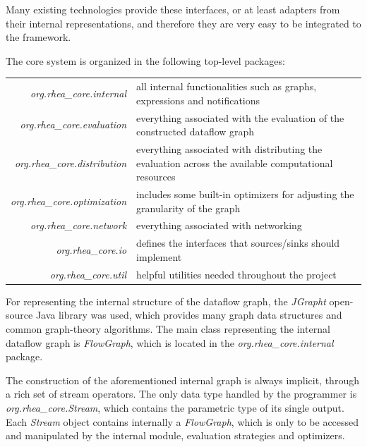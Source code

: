 \documentclass{dithesis}
\begin{document}
Many existing technologies provide these interfaces, or at least adapters from their internal representations, and therefore they are very easy to be integrated to the framework.

The core system is organized in the following top-level packages:

\begin{tabularx}{\textwidth}{rX}
	\textit{org.rhea\_core.internal} 
	& all internal functionalities such as graphs, expressions and notifications \\
	\textit{org.rhea\_core.evaluation}
	& everything associated with the evaluation of the constructed dataflow graph \\
	\textit{org.rhea\_core.distribution}
	& everything associated with distributing the evaluation across the available computational resources \\
	\textit{org.rhea\_core.optimization}	
	& includes some built-in optimizers for adjusting the  granularity of the graph \\
	\textit{org.rhea\_core.network}	
	& everything associated with networking \\
	\textit{org.rhea\_core.io}
	& defines the interfaces that sources/sinks should implement \\
	\textit{org.rhea\_core.util}
	& helpful utilities needed throughout the project \\
\end{tabularx}


For representing the internal structure of the dataflow graph, the \textit{JGrapht} open-source Java library was used, which provides many graph data structures and common graph-theory algorithms\cite{jgraph}. The main class representing the internal dataflow graph is \textit{FlowGraph},  which is located in the \textit{org.rhea\_core.internal} package.


The construction of the aforementioned internal graph is always implicit, through a rich set of stream operators. The only data type handled by the programmer is \textit{org.rhea\_core.Stream}, which contains the parametric type of its single output. Each \textit{Stream} object contains internally a \textit{FlowGraph}, which is only to be accessed and manipulated by the internal module, evaluation strategies and optimizers.
\end{document}

